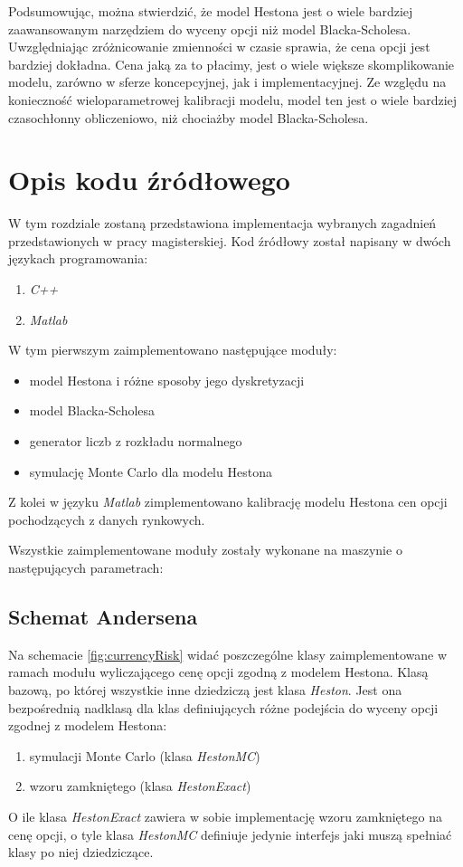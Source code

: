 \documentclass{pracamgr}
\begin{document}
Podsumowując, można stwierdzić, że model Hestona jest o wiele bardziej zaawansowanym
narzędziem do wyceny opcji niż model Blacka-Scholesa. Uwzględniając zróżnicowanie zmienności 
w czasie sprawia, że cena opcji jest bardziej dokładna. Cena jaką za to płacimy,
jest o wiele większe skomplikowanie modelu, zarówno w sferze koncepcyjnej, jak i 
implementacyjnej. Ze względu na konieczność wieloparametrowej kalibracji modelu, 
model ten jest o wiele bardziej czasochłonny obliczeniowo, niż chociażby model Blacka-Scholesa.

\cleardoublepage
{}
\appendix

\chapter{Opis kodu źródłowego}

W tym rozdziale zostaną przedstawiona implementacja wybranych zagadnień przedstawionych w 
pracy magisterskiej. Kod źródłowy został napisany w dwóch językach programowania: 
\begin{enumerate}
  \item \textit{C++}
  \item \textit{Matlab}
\end{enumerate}
W tym pierwszym zaimplementowano następujące moduły:
\begin{itemize}
  \item model Hestona i różne sposoby jego dyskretyzacji
  \item model Blacka-Scholesa
  \item generator liczb z rozkładu normalnego
  \item symulację Monte Carlo dla modelu Hestona
\end{itemize}
Z kolei w języku \textit{Matlab} zimplementowano kalibrację modelu Hestona cen opcji pochodzących
z danych rynkowych.

Wszystkie zaimplementowane moduły zostały wykonane na maszynie o następujących parametrach:


\section{Schemat Andersena}
Na schemacie \ref{fig:currencyRisk} widać poszczególne klasy zaimplementowane w 
ramach modułu wyliczającego cenę opcji zgodną z modelem Hestona.
Klasą bazową, po której wszystkie inne dziedziczą jest klasa \textit{Heston}.
Jest ona bezpośrednią nadklasą dla klas definiujących różne podejścia do wyceny opcji zgodnej
z modelem Hestona:
\begin{enumerate}
  \item symulacji Monte Carlo (klasa \textit{HestonMC})
  \item wzoru zamkniętego (klasa \textit{HestonExact})
\end{enumerate}
O ile klasa \textit{HestonExact} zawiera w sobie implementację wzoru zamkniętego na cenę opcji,
o tyle klasa \textit{HestonMC} definiuje jedynie interfejs jaki muszą spełniać klasy po niej 
dziedziczące.
\end{document}
